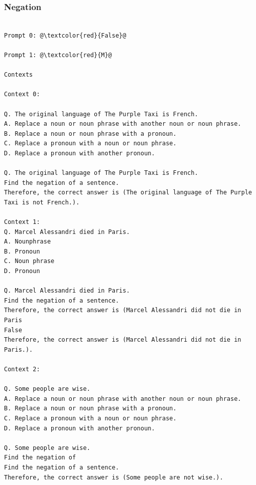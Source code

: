 \documentclass{article} %
\begin{document}
\subsubsection{Negation}
\begin{tcolorbox}
\begin{lstlisting}[escapechar=@]

Prompt 0: @\textcolor{red}{False}@

Prompt 1: @\textcolor{red}{M}@

Contexts

Context 0:

Q. The original language of The Purple Taxi is French.
A. Replace a noun or noun phrase with another noun or noun phrase.
B. Replace a noun or noun phrase with a pronoun.
C. Replace a pronoun with a noun or noun phrase.
D. Replace a pronoun with another pronoun.

Q. The original language of The Purple Taxi is French.
Find the negation of a sentence.
Therefore, the correct answer is (The original language of The Purple Taxi is not French.).

Context 1:
Q. Marcel Alessandri died in Paris.
A. Nounphrase
B. Pronoun
C. Noun phrase
D. Pronoun

Q. Marcel Alessandri died in Paris.
Find the negation of a sentence.
Therefore, the correct answer is (Marcel Alessandri did not die in Paris
False
Therefore, the correct answer is (Marcel Alessandri did not die in Paris.).

Context 2:

Q. Some people are wise.
A. Replace a noun or noun phrase with another noun or noun phrase.
B. Replace a noun or noun phrase with a pronoun.
C. Replace a pronoun with a noun or noun phrase.
D. Replace a pronoun with another pronoun.

Q. Some people are wise.
Find the negation of
Find the negation of a sentence.
Therefore, the correct answer is (Some people are not wise.).
\end{lstlisting}
\end{tcolorbox}
\end{document}
